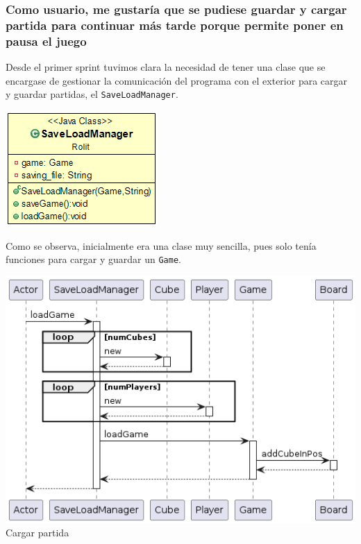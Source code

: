 \documentclass[../DocumentoOficial.tex]{subfiles}
\begin{document}
\subsubsection{Como usuario, me gustaría que se pudiese guardar y cargar partida para continuar más tarde porque permite poner en pausa el juego}
\begin{sprint}[1]
Desde el primer sprint tuvimos clara la necesidad de tener una clase que se encargase de gestionar la comunicación del programa con el exterior para cargar y guardar partidas, el \texttt{SaveLoadManager}.

\begin{center}
\centering
\includegraphics[scale=0.5]{save-load-manager-sprint1.png}
\end{center}

Como se observa, inicialmente era una clase muy sencilla, pues solo tenía funciones para cargar y guardar un \texttt{Game}.

\begin{center}
\centering
\includegraphics[scale=0.48]{load-sprint1.png}\\
\footnotesize{Cargar partida}
\end{center}


\end{sprint}
\end{document}
